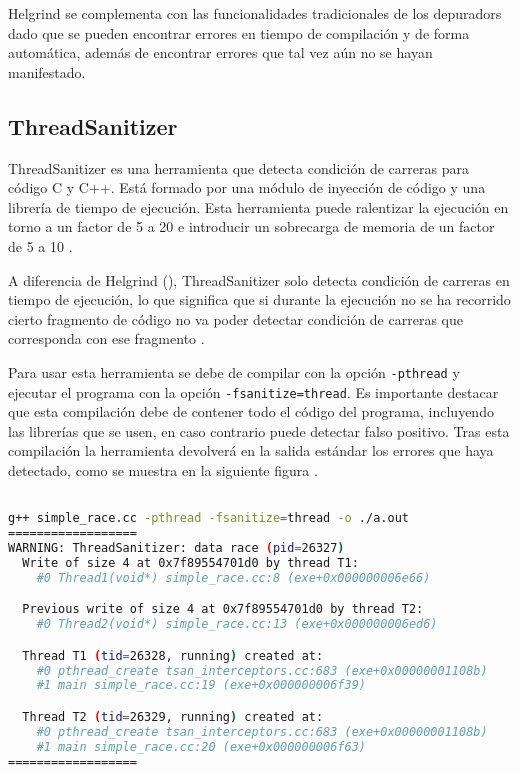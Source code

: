 Helgrind se complementa con las funcionalidades tradicionales de los \glspl{depurador} dado que se pueden encontrar errores en \gls{tiempo de compilación} y de forma automática, además de encontrar errores que tal vez aún no se hayan manifestado.

\subsection{ThreadSanitizer}{\label{subsec:thread-sanitizer}}

ThreadSanitizer es una herramienta que detecta \glspl{condición de carrera} para código C y C++. Está formado por una módulo de \gls{inyección de código} y una librería de \gls{tiempo de ejecución}. Esta herramienta puede ralentizar la ejecución en torno a un factor de 5 a 20 e introducir un sobrecarga de memoria de un factor de 5 a 10 \cite{ThreadSanitizer}.

A diferencia de Helgrind (), ThreadSanitizer solo detecta \glspl{condición de carrera} en \gls{tiempo de ejecución}, lo que significa que si durante la ejecución no se ha recorrido cierto fragmento de código no va poder detectar \glspl{condición de carrera} que corresponda con ese fragmento \cite{ThreadSanitizerGithub}.

Para usar esta herramienta se debe de compilar con la opción \texttt{-pthread} y ejecutar el programa con la opción \texttt{-fsanitize=thread}. Es importante destacar que esta \gls{compilación} debe de contener todo el código del programa, incluyendo las librerías que se usen, en caso contrario puede detectar \gls{falso positivo}. Tras esta \gls{compilación} la herramienta devolverá en la \gls{salida estándar} los errores que haya detectado, como se muestra en la siguiente figura \cite{ThreadSanitizer}.

\begin{lstlisting}[language=bash, caption={Muestra de salida de ThreadSanitizer al detectar un error de condición de carrera \cite{ThreadSanitizerGithub}}]

g++ simple_race.cc -pthread -fsanitize=thread -o ./a.out 
==================
WARNING: ThreadSanitizer: data race (pid=26327)
  Write of size 4 at 0x7f89554701d0 by thread T1:
    #0 Thread1(void*) simple_race.cc:8 (exe+0x000000006e66)

  Previous write of size 4 at 0x7f89554701d0 by thread T2:
    #0 Thread2(void*) simple_race.cc:13 (exe+0x000000006ed6)

  Thread T1 (tid=26328, running) created at:
    #0 pthread_create tsan_interceptors.cc:683 (exe+0x00000001108b)
    #1 main simple_race.cc:19 (exe+0x000000006f39)

  Thread T2 (tid=26329, running) created at:
    #0 pthread_create tsan_interceptors.cc:683 (exe+0x00000001108b)
    #1 main simple_race.cc:20 (exe+0x000000006f63)
==================

\end{lstlisting}

